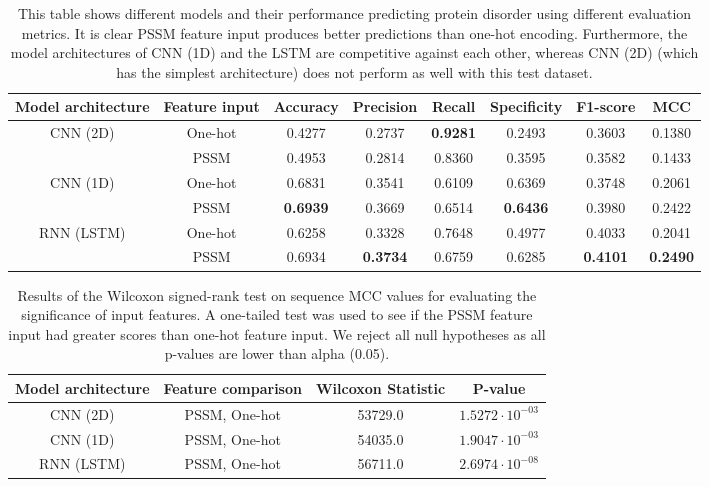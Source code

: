 \documentclass{l4proj}
\begin{document}
\begin{table}
    \centering
    \caption{This table shows different models and their performance predicting protein disorder using different evaluation metrics. It is clear PSSM feature input produces better predictions than one-hot encoding. Furthermore, the model architectures of CNN (1D) and the LSTM are competitive against each other, whereas CNN (2D) (which has the simplest architecture) does not perform as well with this test dataset.}
    \begin{tabular}{@{}cccccccc@{}}
    \toprule
    Model architecture & Feature input & Accuracy & Precision & Recall & Specificity & F1-score & MCC \\ \midrule
    \multirow{2}{*}{CNN (2D)} & One-hot & 0.4277 & 0.2737 & \textbf{0.9281} & 0.2493 & 0.3603 & 0.1380 \\
     & PSSM & 0.4953 & 0.2814 & 0.8360 & 0.3595 & 0.3582 & 0.1433 \\
    \multirow{2}{*}{CNN (1D)} & One-hot & 0.6831 & 0.3541 & 0.6109 & 0.6369 & 0.3748 & 0.2061 \\
     & PSSM & \textbf{0.6939} & 0.3669 & 0.6514 & \textbf{0.6436} & 0.3980 & 0.2422 \\
    \multirow{2}{*}{RNN (LSTM)} & One-hot & 0.6258 & 0.3328 & 0.7648 & 0.4977 & 0.4033 & 0.2041 \\
     & PSSM & 0.6934 & \textbf{0.3734} & 0.6759 & 0.6285 & \textbf{0.4101} & \textbf{0.2490} \\ \cmidrule(l){1-8} 
    \end{tabular}
    
    \label{tab:testDataset}
\end{table}

\begin{table}
    \centering
    \caption{Results of the Wilcoxon signed-rank test on sequence MCC values for evaluating the significance of input features. A one-tailed test was used to see if the PSSM feature input had greater scores than one-hot feature input. We reject all null hypotheses as all p-values are lower than alpha (0.05).}
    \begin{tabular}{@{}cccc@{}}
    \toprule
    Model architecture & Feature comparison & Wilcoxon Statistic & P-value \\ \midrule
    CNN (2D) & PSSM, One-hot & 53729.0 & $1.5272\cdot{10^{-03}}$ \\
    CNN (1D) & PSSM, One-hot & 54035.0 & $1.9047\cdot{10^{-03}}$ \\
    RNN (LSTM) & PSSM, One-hot & 56711.0 & $2.6974\cdot{10^{-08}}$ \\ \bottomrule
    \end{tabular}
    
    \label{tab:testwilcinput}
\end{table}
\end{document}
